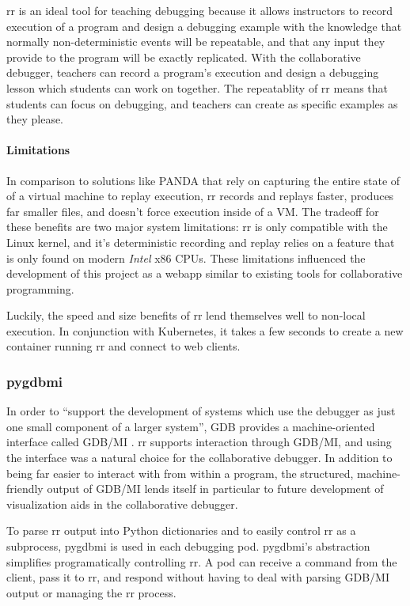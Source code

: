 \documentclass[12pt]{article}
\begin{document}
rr is an ideal tool for teaching debugging because it allows
instructors to record execution of a program and design a debugging
example with the knowledge that normally non-deterministic events will
be repeatable, and that any input they provide to the program will be
exactly replicated.  With the collaborative debugger, teachers can
record a program's execution and design a debugging lesson which
students can work on together.  The repeatablity of rr means that
students can focus on debugging, and teachers can create as specific
examples as they please.

\paragraph{Limitations}

In comparison to solutions like PANDA\cite{10.1145/2843859.2843867}
that rely on capturing the entire state of of a virtual machine to
replay execution, rr records and replays faster, produces far smaller
files, and doesn't force execution inside of a
VM.\cite{DBLP:journals/corr/OCallahanJFHNP17} The tradeoff for these
benefits are two major system limitations: rr is only compatible with
the Linux kernel, and it's deterministic recording and replay relies
on a feature that is only found on modern \textit{Intel} x86 CPUs.
These limitations influenced the development of this project as a
webapp similar to existing tools for collaborative programming.
\par

Luckily, the speed and size benefits of rr lend themselves well to
non-local execution.  In conjunction with Kubernetes, it takes a few
seconds to create a new container running rr and connect to web
clients.

\subsubsection{pygdbmi}

In order to ``support the development of systems which use the
debugger as just one small component of a larger system'', GDB
provides a machine-oriented interface called GDB/MI \cite{gdbman}. rr
supports interaction through GDB/MI, and using the interface was a
natural choice for the collaborative debugger.  In addition to being
far easier to interact with from within a program, the structured,
machine-friendly output of GDB/MI lends itself in particular to future
development of visualization aids in the collaborative debugger.
\par
To parse rr output into Python dictionaries and to easily control rr
as a subprocess, pygdbmi \cite{pygdbmi} is used in each debugging pod.
pygdbmi's abstraction simplifies programatically controlling rr.  A
pod can receive a command from the client, pass it to rr, and respond
without having to deal with parsing GDB/MI output or managing the rr
process.
\end{document}
